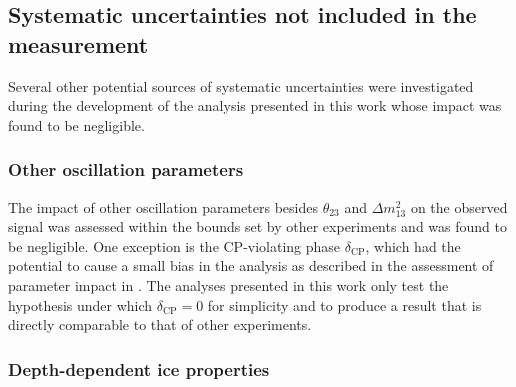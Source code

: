 \subsection{Systematic uncertainties not included in the measurement}
\label{sec:other-uncertainties}

Several other potential sources of systematic uncertainties were investigated during the development of the analysis presented in this work whose impact was found to be negligible.


\subsubsection{Other oscillation parameters}
\label{sec:other-oscillation-syst}

The impact of other oscillation parameters besides $\theta_{23}$ and $\Delta m^2_{13}$ on the observed signal was assessed within the bounds set by other experiments and was found to be negligible. One exception is the CP-violating phase $\delta_{\mathrm{CP}}$, which had the potential to cause a small bias in the analysis as described in the assessment of parameter impact in . The analyses presented in this work only test the hypothesis under which $\delta_{\mathrm{CP}}=0$ for simplicity and to produce a result that is directly comparable to that of other experiments.

\subsubsection{Depth-dependent ice properties}
\label{sec:depth-dependent-ice-properties}

